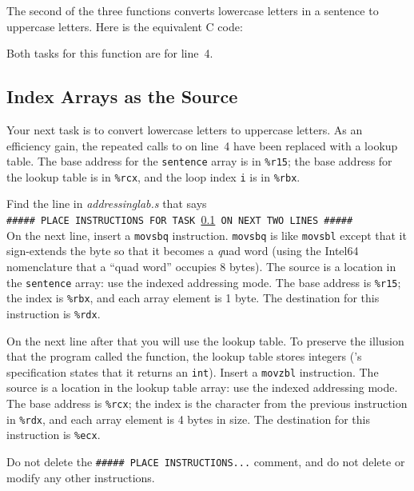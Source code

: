 The second of the three functions converts lowercase letters in a sentence
to uppercase letters. Here is the equivalent C code:



Both tasks for this function are for line~4.

\subsection{Index Arrays as the Source}\label{task6}

Your next task is to convert lowercase letters to uppercase letters. As an
efficiency gain, the repeated calls to  on line~4 have been
replaced with a lookup table. The base address for the \lstinline{sentence}
array is in \lstinline{%r15}; the base address for the lookup table is in
\lstinline{%rcx}, and the loop index \lstinline{i} is in \lstinline{%rbx}.

Find the line in \textit{addressinglab.s} that says \\
\texttt{\#\#\#\#\# PLACE INSTRUCTIONS FOR TASK \ref{task6} ON NEXT TWO LINES \#\#\#\#\#} \\
On the next line, insert a \lstinline{movsbq} instruction. \lstinline{movsbq}
is like \lstinline{movsbl} except that it sign-extends the byte so that it
becomes a \textit{q}uad word (using the Intel64 nomenclature that a ``quad
word'' occupies 8 bytes). The source is a location in the \lstinline{sentence}
array: use the indexed addressing mode. The base address is \lstinline{%r15};
the index is \lstinline{%rbx}, and each array element is 1 byte. The
destination for this instruction is \lstinline{%rdx}.

On the next line after that you will use the  lookup table.
To preserve the illusion that the program called the 
function, the lookup table stores integers ('s specification
states that it returns an \lstinline{int}). Insert a \lstinline{movzbl}
instruction. The source is a location in the lookup table array: use the indexed
addressing mode. The base address is \lstinline{%rcx}; the index is the
character from the previous instruction in \lstinline{%rdx}, and each array
element is 4 bytes in size. The destination for this instruction is
\lstinline{%ecx}.


Do not delete the \texttt{\#\#\#\#\# PLACE INSTRUCTIONS...} comment, and do not
delete or modify any other instructions.

